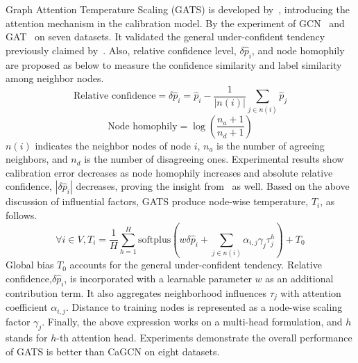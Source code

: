  Graph Attention Temperature Scaling (GATS) is developed by~\cite{hsu2022makes}, introducing the attention mechanism in the calibration model. By the experiment of GCN~\cite{kipf2016semi} and GAT~\cite{velivckovic2017graph} on seven datasets. It validated the general under-confident tendency previously claimed by~\cite{wang2021confident}. Also, relative confidence level, $\delta \hat{p}_i$, and node homophily are proposed as below to measure the confidence similarity and label similarity among neighbor nodes. 
 \begin{equation}
     \text{Relative confidence}=\delta \hat{p}_i=\hat{p}_i-\frac{1}{|n(i)|}\sum_{j \in n(i)}\hat{p}_j
 \end{equation}
 \begin{equation}
     \text{Node homophily}=\log(\frac{n_a+1}{n_d+1})
 \end{equation}
$n(i)$ indicates the neighbor nodes of node $i$, $n_a$ is the number of agreeing neighbors, and $n_d$ is the number of disagreeing ones. Experimental results show calibration error decreases as node homophily increases and absolute relative confidence, $|\delta \hat{p}_i|$ decreases, proving the insight from~\cite{wang2021confident} as well. Based on the above discussion of influential factors, GATS produce node-wise temperature, $T_i$, as follows.
\begin{equation}
    \forall i \in V, T_i=\frac{1}{H}\sum_{h=1}^H \text{softplus}(w\delta\hat{p}_i+\sum_{j\in n(i)}\alpha_{i,j}\gamma_j\tau_j^h)+T_0
\end{equation}
Global bias $T_0$ accounts for the general under-confident tendency. Relative confidence,$\delta\hat{p}_i$, is incorporated with a learnable parameter $w$ as an additional contribution term. It also aggregates neighborhood influences $\tau_j$ with attention coefficient $\alpha_{i,j}$. Distance to training nodes is represented as a node-wise scaling factor $\gamma_j$. Finally, the above expression works on a multi-head formulation, and $h$ stands for $h$-th attention head. Experiments demonstrate the overall performance of GATS is better than CaGCN on eight datasets.